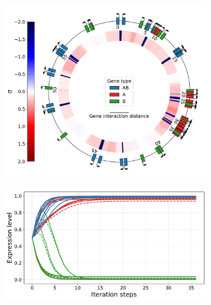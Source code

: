 \begin{figure}[H]
\centering
\begin{subfigure}[t]{0.42\textwidth}
\includegraphics[width=\textwidth]{alife/img/genome_and_tsc_rep13_env_A.pdf}
\label{subfig:alife:best_genome_A}
\end{subfigure}
\begin{subfigure}[t]{0.56\textwidth}
\includegraphics[width=\textwidth]{alife/img/best_rep13_env_A.pdf}
\label{subfig:alife:best_expr_A}
\end{subfigure}
\vspace{-5mm}


\end{figure}

